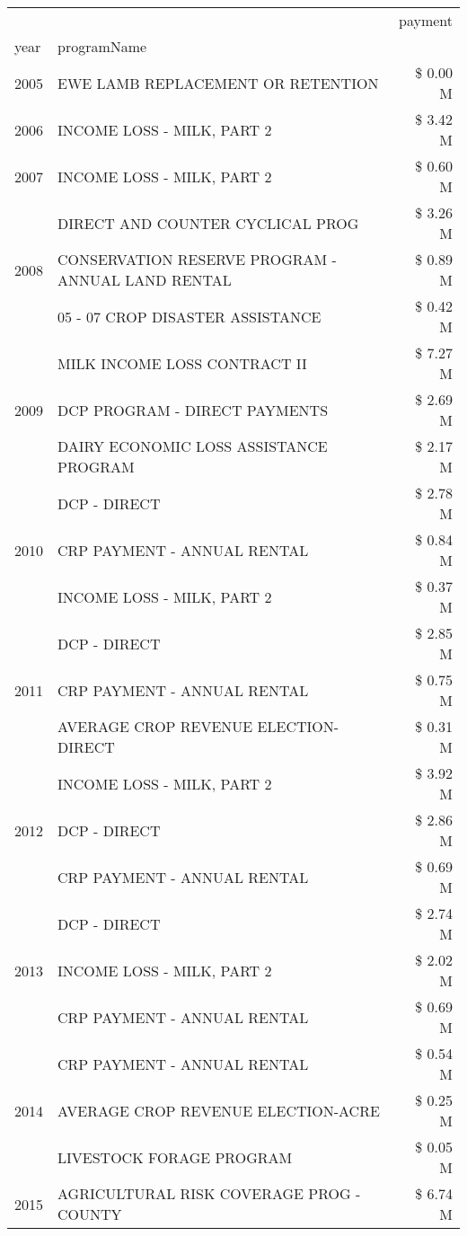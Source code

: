 \begin{tabular}{llr}
\toprule
 &  & payment \\
year & programName &  \\
\midrule
2005 & EWE LAMB REPLACEMENT OR RETENTION & \$ 0.00 M \\
\cline{1-3}
2006 & INCOME LOSS - MILK, PART 2 & \$ 3.42 M \\
\cline{1-3}
2007 & INCOME LOSS - MILK, PART 2 & \$ 0.60 M \\
\cline{1-3}
\multirow[t]{3}{*}{2008} & DIRECT AND COUNTER CYCLICAL PROG & \$ 3.26 M \\
 & CONSERVATION RESERVE PROGRAM - ANNUAL LAND RENTAL & \$ 0.89 M \\
 & 05 - 07 CROP DISASTER ASSISTANCE & \$ 0.42 M \\
\cline{1-3}
\multirow[t]{3}{*}{2009} & MILK INCOME LOSS CONTRACT II & \$ 7.27 M \\
 & DCP PROGRAM - DIRECT PAYMENTS & \$ 2.69 M \\
 & DAIRY ECONOMIC LOSS ASSISTANCE PROGRAM & \$ 2.17 M \\
\cline{1-3}
\multirow[t]{3}{*}{2010} & DCP - DIRECT & \$ 2.78 M \\
 & CRP PAYMENT - ANNUAL RENTAL & \$ 0.84 M \\
 & INCOME LOSS - MILK, PART 2 & \$ 0.37 M \\
\cline{1-3}
\multirow[t]{3}{*}{2011} & DCP - DIRECT & \$ 2.85 M \\
 & CRP PAYMENT - ANNUAL RENTAL & \$ 0.75 M \\
 & AVERAGE CROP REVENUE ELECTION-DIRECT & \$ 0.31 M \\
\cline{1-3}
\multirow[t]{3}{*}{2012} & INCOME LOSS - MILK, PART 2 & \$ 3.92 M \\
 & DCP - DIRECT & \$ 2.86 M \\
 & CRP PAYMENT - ANNUAL RENTAL & \$ 0.69 M \\
\cline{1-3}
\multirow[t]{3}{*}{2013} & DCP - DIRECT & \$ 2.74 M \\
 & INCOME LOSS - MILK, PART 2 & \$ 2.02 M \\
 & CRP PAYMENT - ANNUAL RENTAL & \$ 0.69 M \\
\cline{1-3}
\multirow[t]{3}{*}{2014} & CRP PAYMENT - ANNUAL RENTAL & \$ 0.54 M \\
 & AVERAGE CROP REVENUE ELECTION-ACRE & \$ 0.25 M \\
 & LIVESTOCK FORAGE PROGRAM & \$ 0.05 M \\
\cline{1-3}
\multirow[t]{3}{*}{2015} & AGRICULTURAL RISK COVERAGE PROG - COUNTY & \$ 6.74 M \\

\end{tabular}
